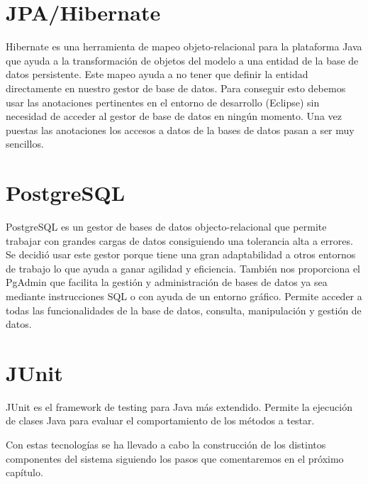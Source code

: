 \section{JPA/Hibernate}
Hibernate es una herramienta de mapeo objeto-relacional para la plataforma Java que ayuda a la transformación de objetos del modelo a una entidad de la base de datos persistente. Este mapeo ayuda a  no tener que definir la entidad directamente en nuestro gestor de base de datos. Para conseguir esto debemos usar las anotaciones pertinentes en el entorno de desarrollo (Eclipse) sin necesidad de acceder al gestor de base de datos en ningún momento. Una vez puestas las anotaciones los accesos a datos de la  bases de datos pasan a ser muy sencillos.





\section{PostgreSQL}
PostgreSQL es un gestor de bases de datos objecto-relacional  que permite trabajar con grandes cargas de datos consiguiendo una tolerancia alta a errores.
Se decidió usar este gestor porque tiene una gran adaptabilidad a otros entornos de trabajo lo que ayuda a ganar agilidad y eficiencia. También nos proporciona  el PgAdmin que facilita la gestión y administración de bases de datos ya sea mediante instrucciones SQL o con ayuda de un entorno gráfico. Permite acceder a todas las funcionalidades de la base de datos, consulta, manipulación y gestión de datos.
\section{JUnit}
JUnit es el framework de testing para Java más extendido.
Permite la ejecución de clases Java para evaluar el comportamiento de los métodos a testar.


\vspace{1cm}

Con estas tecnologías se ha llevado a cabo la construcción de los distintos componentes del sistema siguiendo los pasos que comentaremos en el próximo capítulo.
